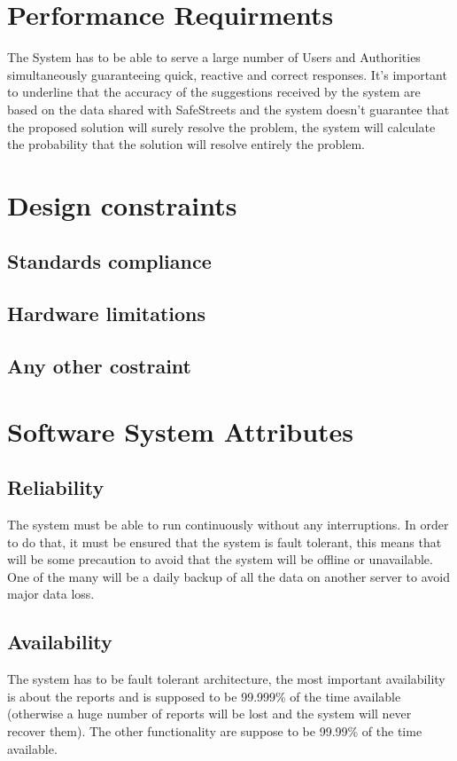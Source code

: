 \documentclass[12pt,a4paper]{report}
\begin{document}
			
	
	\section{Performance Requirments}
		The System has to be able to serve a large number of Users and Authorities simultaneously guaranteeing quick, 
		reactive and correct responses. It's important to underline that the accuracy of the suggestions received by the system
		are based on the data shared with SafeStreets and the system doesn't guarantee that the proposed solution will surely
		resolve the problem, the system will calculate the probability that the solution will resolve entirely the problem.
	\section{Design constraints}
		\subsection{Standards compliance}
			
		\subsection{Hardware limitations}
			
		\subsection{Any other costraint}
			
	\section{Software System Attributes}
		\subsection{Reliability}
			The system must be able to run continuously without any interruptions. In order to do that, it must 
			be ensured  that  the system is fault tolerant, this means that will be some precaution to avoid that the system
			will be offline or unavailable. One of the many will be a daily backup of all the data on another server to avoid major
			data loss.
		\subsection{Availability}
			The system has to be fault tolerant architecture, the most important availability is about the reports and is supposed
			to be 99.999\%  of the time available (otherwise a huge number of reports will be lost and the system will never recover them). The other
			functionality are suppose to be 99.99\% of the time available.
\end{document}
